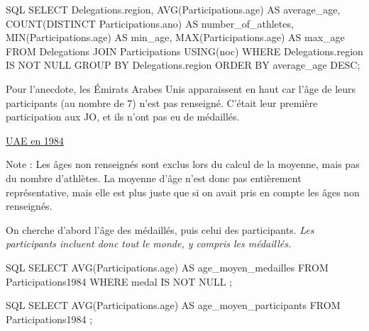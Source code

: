 \documentclass{mytex}
\begin{document}

\begin{codeboxlang}[title=Tableau statistique complet]{SQL}
	SELECT Delegations.region, AVG(Participations.age) AS average_age, COUNT(DISTINCT Participations.ano) AS number_of_athletes, MIN(Participations.age) AS min_age, MAX(Participations.age) AS max_age
	FROM Delegations JOIN Participations USING(noc)
	WHERE Delegations.region IS NOT NULL
	GROUP BY Delegations.region
	ORDER BY average_age DESC;
\end{codeboxlang}


Pour l'anecdote, les Émirats Arabes Unis apparaissent en haut car l'âge de leurs participants (au nombre de 7) n'est pas renseigné.
C'était leur première participation aux JO, et ils n'ont pas eu de médaillés.

\href{https://en.wikipedia.org/wiki/United\_Arab\_Emirates\_at\_the\_1984\_Summer\_Olympics}{UAE en 1984}

Note : Les âges non renseignés sont exclus lors du calcul de la moyenne, mais pas du nombre d'athlètes.
La moyenne d'âge n'est donc pas entièrement représentative, mais elle est plus juste que si on avait pris en compte les âges non renseignés.


On cherche d'abord l'âge des médaillés, puis celui des participants.
\emph{Les participants incluent donc tout le monde, y compris les médaillés.}

\begin{codeboxlang}[title=Âge moyen des médaillés]{SQL}
	SELECT AVG(Participations.age) AS age_moyen_medailles
	FROM Participations1984
	WHERE medal IS NOT NULL ;
\end{codeboxlang}


\begin{codeboxlang}[title=Âge moyen des participants]{SQL}
	SELECT AVG(Participations.age) AS age_moyen_participants
	FROM Participations1984 ;
\end{codeboxlang}


\end{document}
